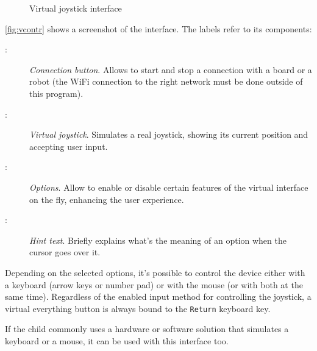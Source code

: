 \begin{figure}[h]
  

  \caption{Virtual joystick interface}
  \label{fig:vcontr}
\end{figure}

\beforelist \autoref{fig:vcontr} shows a screenshot of the interface. The labels
refer to its components:
\begin{description}
\item[:]
  \textit{Connection button}. Allows to start and stop a connection with a board
  or a robot (the WiFi connection to the right network must be done outside of
  this program).
\item[:]
  \textit{Virtual joystick}. Simulates a real joystick, showing its current
  position and accepting user input.
\item[:]
  \textit{Options}. Allow to enable or disable certain features of the virtual
  interface on the fly, enhancing the user experience.
\item[:]
  \textit{Hint text}. Briefly explains what's the meaning of an option when the
  cursor goes over it.
\end{description}
\afterlist*
Depending on the selected options, it's possible to control the device either
with a keyboard (arrow keys or number pad) or with the mouse (or with both at
the same time). Regardless of the enabled input method for controlling the
joystick, a virtual everything button is always bound to the \Verb|Return|
keyboard key.

If the child commonly uses a hardware or software solution
that simulates a keyboard or a mouse, it can be used with this interface too.
